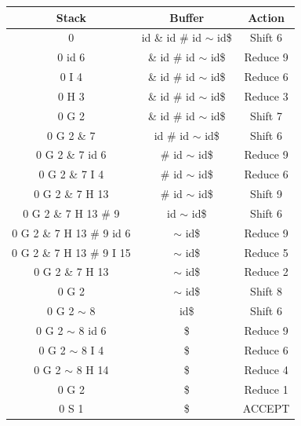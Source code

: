 \documentclass[]{article}
\begin{document}
    \begin{latin}
        \centering
        \begin{tabular}{c|c|c}
            \textbf{Stack} & \textbf{Buffer} & \textbf{Action}\\
            \hline
            0 & id \& id \# id $\sim$ id\$ & Shift 6\\
            0 id 6 & \& id \# id $\sim$ id\$ & Reduce 9\\
            0 I 4 & \& id \# id $\sim$ id\$ & Reduce 6\\
            0 H 3 & \& id \# id $\sim$ id\$ & Reduce 3\\
            0 G 2 & \& id \# id $\sim$ id\$ & Shift 7\\
            0 G 2 \& 7 & id \# id $\sim$ id\$ & Shift 6\\
            0 G 2 \& 7 id 6 & \# id $\sim$ id\$ & Reduce 9\\
            0 G 2 \& 7 I 4 & \# id $\sim$ id\$ & Reduce 6\\
            0 G 2 \& 7 H 13 & \# id $\sim$ id\$ & Shift 9\\
            0 G 2 \& 7 H 13 \# 9 & id $\sim$ id\$ & Shift 6\\
            0 G 2 \& 7 H 13 \# 9 id 6 & $\sim$ id\$ & Reduce 9\\
            0 G 2 \& 7 H 13 \# 9 I 15 & $\sim$ id\$ & Reduce 5\\
            0 G 2 \& 7 H 13 & $\sim$ id\$ & Reduce 2\\
            0 G 2 & $\sim$ id\$ & Shift 8\\
            0 G 2 $\sim$ 8 & id\$ & Shift 6\\
            0 G 2 $\sim$ 8 id 6 & \$ & Reduce 9\\
            0 G 2 $\sim$ 8 I 4 & \$ & Reduce 6\\
            0 G 2 $\sim$ 8 H 14 & \$ & Reduce 4\\
            0 G 2 & \$ & Reduce 1\\
            0 S 1 & \$ & ACCEPT \\
        \end{tabular}
    \end{latin}
\end{document}
